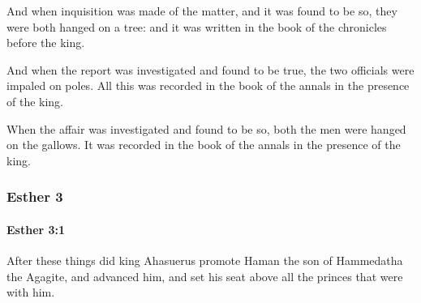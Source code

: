 			\begin{versebox}
					\item[BHS] 
					\item[LXX] 
					\item[ASV] And when inquisition was made of the matter, and it was found to be so, they were both hanged on a tree: and it was written in the book of the chronicles before the king.
					\item[NIV] And when the report was investigated and found to be true, the two officials were impaled on poles. All this was recorded in the book of the annals in the presence of the king.
					\item[NRSV] When the affair was investigated and found to be so, both the men were hanged on the gallows. It was recorded in the book of the annals in the presence of the king.
			\end{versebox}
	\subsubsection{Esther 3} %
		\label{ESTHER-3}

		\paragraph{Esther 3:1} %
			\label{ESTHER-3-1}

			After these things did king Ahasuerus promote Haman the son of Hammedatha the Agagite, and advanced him, and set his seat above all the princes that were with him.

